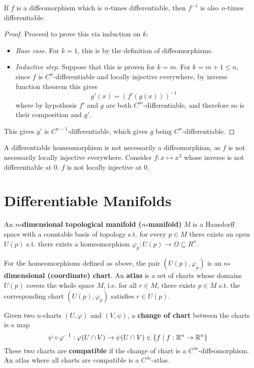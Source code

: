 \documentclass{article}
\begin{document}
\begin{proposition}
    If $f$ is a diffeomorphism which is $n$-times differentiable, then $f^{-1}$ is also $n$-times differentiable.
\end{proposition}

\begin{proof}
    Proceed to prove this via induction on $k$:
    \begin{itemize}
        \item \emph{Base case}. For $k = 1$, this is by the definition of diffeomorphisms.
        \item \emph{Inductive step}. Suppose that this is proven for $k = m$. For $k = m+1 \leq n$, since $f$ is $C^n$-differentiable and locally injective everywhere, by inverse function theorem this gives
        \[
            g'(x) = (f'(g(x)))^{-1}
        \]
        where by hypothesis $f'$ and $g$ are both $C^m$-differentiable, and therefore so is their composition and $g'$.
    \end{itemize}
    This gives $g'$ is $C^{n-1}$-differentiable, which gives $g$ being $C^n$-differentiable.
\end{proof}

\begin{remark}
    A differentiable homeomorphism is not necessarily a diffeomorphism, as $f$ is not necessarily locally injective everywhere. Consider $f: x \mapsto x^3$ whose inverse is not differentiable at $0$. $f$ is not locally injective at 0.  
\end{remark}

\section{Differentiable Manifolds}

\begin{definition}[Manifold]
    An \textbf{$n$-dimensional topological manifold ($n$-manifold)} $M$ is a Hausdorff space with a countable basis of topology s.t. for every $p \in M$ there exists an open $U(p)$ s.t. there exists a homeomorphism $\varphi_p: U(p) \to \Omega \subseteq R^n$.
\end{definition}

\begin{definition}
    For the homeomorphisms defined as above, the pair $(U(p), \varphi_p)$ is an \textbf{$n$-dimensional (coordinate) chart}. An \textbf{atlas} is a set of charts whose domains $U(p)$ covers the whole space $M$, i.e. for all $r \in M$, there exists $p \in M$ s.t. the corresponding chart $(U(p), \varphi_p)$ satisfies $r \in U(p)$. 

    Given two $n$-charts $(U, \varphi)$ and $(V, \psi)$, a \textbf{change of chart} between the charts is a map
    \[
        \psi \circ \varphi^{-1} : \varphi(U \cap V) \to \psi(U \cap V) \in \{f \mid f: \mathbb{R}^n \to \mathbb{R}^n\}
    \]
    These two charts are \textbf{compatible} if the change of chart is a $C^{\infty}$-diffeomorphism. An atlas where all charts are compatible is a $C^{\infty}$-atlas.
\end{definition}
\end{document}
